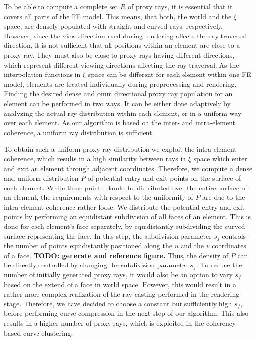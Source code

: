 \documentclass[review,journal]{vgtc}         %
\begin{document}
To be able to compute a complete set $R$ of proxy rays, it is essential that it covers all parts of the FE model. This means, that both, the world and the $\xi$ space, are densely populated with straight and curved rays, respectively. However, since the view direction used during rendering affects the ray traversal direction, it is not sufficient that all positions within an element are close to a proxy ray. They must also be close to proxy rays having different directions, which represent different viewing directions affecting the ray traversal. As the interpolation functions in $\xi$ space can be different for each element within one FE model, elements are treated individually during preprocessing and rendering. Finding the desired dense and omni directional proxy ray population for an element can be performed in two ways. It can be either done adaptively by analyzing the actual ray distribution within each element, or in a uniform way over each element. As our algorithm is based on the inter- and intra-element coherence, a uniform ray distribution is sufficient.

To obtain such a uniform proxy ray distribution we exploit the intra-element coherence, which results in a high similarity between rays in $\xi$ space which enter and exit an element through adjacent coordinates. Therefore, we compute a dense and uniform distribution $P$ of potential entry and exit points on the surface of each element. While these points should be distributed over the entire surface of an element, the requirements with respect to the uniformity of $P$ are due to the intra-element coherence rather loose. We distribute the potential entry and exit points by performing an equidistant subdivision of all faces of an element. This is done for each element's face separately, by equidistantly subdividing the curved surface representing the face. In this step, the subdivision parameter $s_f$ controls the number of points equidistantly positioned along the $u$ and the $v$ coordinates of a face. \textbf{TODO: generate and reference figure.} Thus, the density of $P$ can be directly controlled by changing the subdivision parameter $s_f$. To reduce the number of initially generated proxy rays, it would also be an option to vary $s_f$ based on the extend of a face in world space. However, this would result in a rather more complex realization of the ray-casting performed in the rendering stage. Therefore, we have decided to choose a constant but sufficiently high $s_f$, before performing curve compression in the next step of our algorithm. This also results in a higher number of proxy rays, which is exploited in the coherency-based curve clustering.
\end{document}
